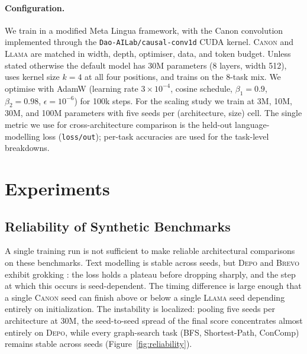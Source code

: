 \documentclass[11pt]{article}
\newcommand{\Canon}{\textsc{Canon}\xspace}
\newcommand{\Llama}{\textsc{Llama}\xspace}
\newcommand{\Depo}{\textsc{Depo}\xspace}
\newcommand{\Brevo}{\textsc{Brevo}\xspace}
\begin{document}
\paragraph{Configuration.}
We train in a modified Meta Lingua framework, with the Canon convolution implemented through
the \texttt{Dao-AILab/causal-conv1d} CUDA kernel. \Canon and \Llama are matched in width,
depth, optimiser, data, and token budget. Unless stated otherwise the default model has 30M
parameters (8 layers, width 512), uses kernel size $k=4$ at all four positions, and trains
on the 8-task mix. We optimise with AdamW (learning rate $3\!\times\!10^{-4}$, cosine
schedule, $\beta_1{=}0.9$, $\beta_2{=}0.98$, $\epsilon{=}10^{-6}$) for 100k steps. For the
scaling study we train at 3M, 10M, 30M, and 100M parameters with five seeds per
(architecture, size) cell. The single metric we use for cross-architecture comparison is
the held-out language-modelling loss (\texttt{loss/out}); per-task accuracies are used for
the task-level breakdowns.

\section{Experiments}

\subsection{Reliability of Synthetic Benchmarks}
\label{sec:reliability}

A single training run is not sufficient to make reliable architectural comparisons on these
benchmarks. Text modelling is stable across seeds, but \Depo and \Brevo exhibit grokking \citep{power2022grokking}:
the loss holds a plateau before dropping sharply, and the step at which this occurs is
seed-dependent. The timing difference is large enough that a single \Canon seed can finish
above or below a single \Llama seed depending entirely on initialization. The instability is
localized: pooling five seeds per architecture at 30M, the seed-to-seed spread of the final
score concentrates almost entirely on \Depo, while every graph-search task (BFS,
Shortest-Path, ConComp) remains stable across seeds (Figure~\ref{fig:reliability}).
\end{document}
